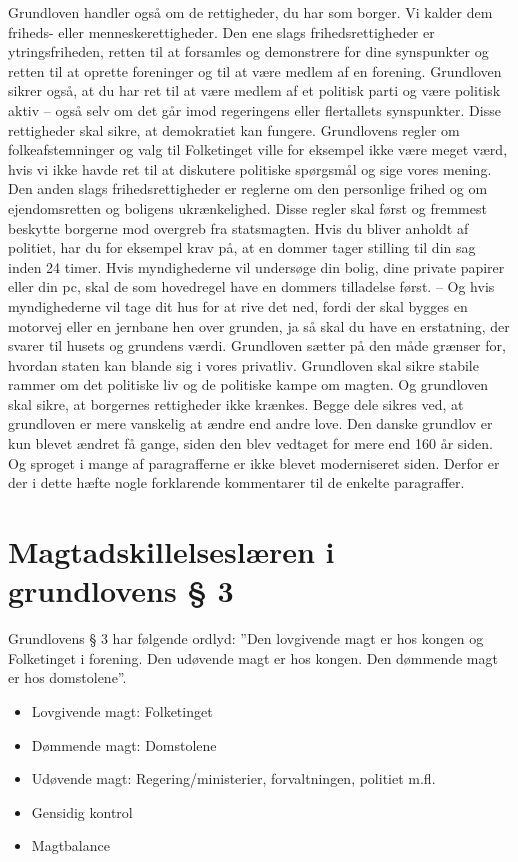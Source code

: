 \documentclass[]{book}
\providecommand{\tightlist}{%
  \setlength{\itemsep}{0pt}\setlength{\parskip}{0pt}}
\begin{document}
Grundloven handler også om de rettigheder, du har som borger. Vi kalder dem friheds- eller menneskerettigheder.
Den ene slags frihedsrettigheder er ytringsfriheden, retten til at forsamles og demonstrere for dine synspunkter og retten til at oprette foreninger og til at være medlem af en forening. Grundloven sikrer også, at du har ret til at være medlem af et politisk parti og være politisk aktiv -- også selv om det går imod regeringens eller flertallets synspunkter. Disse rettigheder skal sikre, at demokratiet kan fungere. Grundlovens regler om folkeafstemninger og valg til Folketinget ville for eksempel ikke være meget værd, hvis vi ikke havde ret til at diskutere politiske spørgsmål og sige vores mening.
Den anden slags frihedsrettigheder er reglerne om den personlige frihed og om ejendomsretten og boligens ukrænkelighed. Disse regler skal først og fremmest beskytte borgerne mod overgreb fra statsmagten. Hvis du bliver anholdt af politiet, har du for eksempel krav på, at en dommer tager stilling til din sag inden 24 timer. Hvis myndighederne vil undersøge din bolig, dine private papirer eller din pc, skal de som hovedregel have en dommers tilladelse først. -- Og hvis myndighederne vil tage dit hus for at rive det ned, fordi der skal bygges en motorvej eller en jernbane hen over grunden, ja så skal du have en erstatning, der svarer til husets og grundens værdi. Grundloven sætter på den måde grænser for, hvordan staten kan blande sig i vores privatliv.
Grundloven skal sikre stabile rammer om det politiske liv og de politiske kampe om magten. Og grundloven skal sikre, at borgernes rettigheder ikke krænkes. Begge dele sikres ved, at grundloven er mere vanskelig at ændre end andre love. Den danske grundlov er kun blevet ændret få gange, siden den blev vedtaget for mere end 160 år siden. Og sproget i mange af paragrafferne er ikke blevet moderniseret siden. Derfor er der i dette hæfte nogle forklarende kommentarer til de enkelte paragraffer.

\hypertarget{magtadskillelseslren-i-grundlovens-3}{%
\section{Magtadskillelseslæren i grundlovens § 3}\label{magtadskillelseslren-i-grundlovens-3}}

Grundlovens § 3 har følgende ordlyd: ''Den lovgivende magt er hos kongen og Folketinget i forening. Den udøvende magt er hos kongen. Den dømmende magt er hos domstolene''.

\begin{itemize}
\tightlist
\item
  Lovgivende magt: Folketinget
\item
  Dømmende magt: Domstolene
\item
  Udøvende magt: Regering/ministerier, forvaltningen, politiet m.fl.
\item
  Gensidig kontrol
\item
  Magtbalance
\end{itemize}
\end{document}
